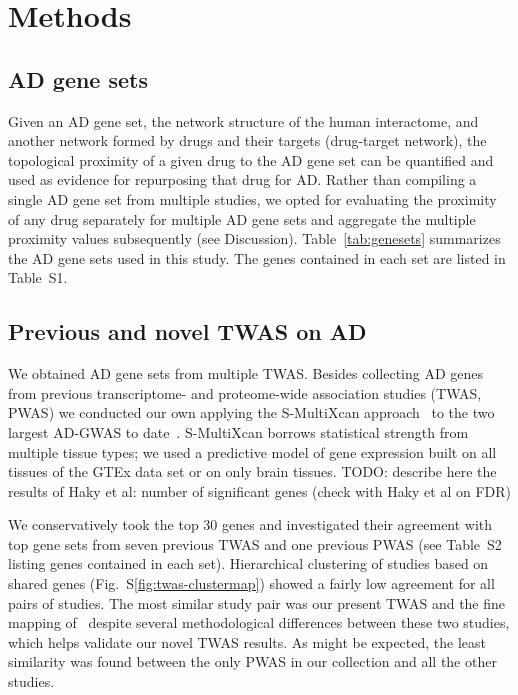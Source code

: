 \documentclass[letterpaper]{article}
\begin{document}
\section{Methods}

\subsection{AD gene sets}

Given an AD gene set, the network structure of the human interactome, and
another network formed by drugs and their targets (drug-target network), the
topological proximity of a given drug to the AD gene set can be
quantified\citep{Guney2016} and used as evidence for repurposing that drug for
AD.  Rather than compiling a single AD gene set from multiple studies, we
opted for evaluating the proximity of any drug separately for multiple AD gene
sets and aggregate the multiple proximity values subsequently (see
Discussion).  Table~\ref{tab:genesets} summarizes the AD gene sets used in
this study.  The genes contained in each set are listed in Table~S1.

\subsection{Previous and novel TWAS on AD}

We obtained AD gene sets from multiple TWAS.  Besides collecting
AD genes from previous transcriptome- and proteome-wide association studies
(TWAS, PWAS) we
conducted our own applying the S-MultiXcan approach~\citep{Barbeira2018} to
the two largest AD-GWAS to date~\citep{Schwartzentruber2021,Wightman2021}.
S-MultiXcan borrows statistical strength from multiple tissue types; we used a
predictive model of gene expression built on all tissues of the GTEx data set
or on only brain tissues.
TODO: describe here the results of Haky et al:
number of significant genes (check with Haky et al on FDR)

We conservatively took the top 30 genes and investigated their agreement with
top gene sets from seven previous TWAS and one previous PWAS (see Table~S2
listing genes contained in each set).  Hierarchical clustering of studies
based on shared genes (Fig.~S\ref{fig:twas-clustermap}) showed a fairly low
agreement for all pairs of studies.  The most similar study pair was our
present TWAS and the fine mapping of~\cite{Jansen2019} despite several
methodological differences between these two studies, which helps validate our
novel TWAS results.  As might be expected, the least similarity was found
between the only PWAS in our collection and all the other studies.
\end{document}
